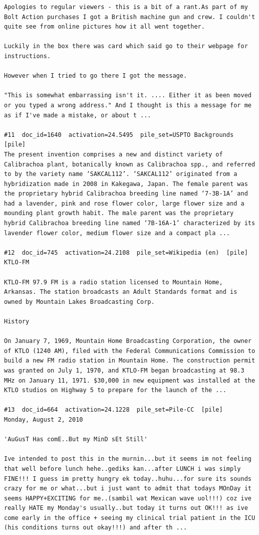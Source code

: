 \begin{verbatim}
Apologies to regular viewers - this is a bit of a rant.As part of my Bolt Action purchases I got a British machine gun and crew. I couldn't quite see from online pictures how it all went together.

Luckily in the box there was card which said go to their webpage for instructions.

However when I tried to go there I got the message.

"This is somewhat embarrassing isn't it. .... Either it as been moved or you typed a wrong address." And I thought is this a message for me as if I've made a mistake, or about t ...

#11  doc_id=1640  activation=24.5495  pile_set=USPTO Backgrounds  [pile]
The present invention comprises a new and distinct variety of Calibrachoa plant, botanically known as Calibrachoa spp., and referred to by the variety name ‘SAKCAL112’. ‘SAKCAL112’ originated from a hybridization made in 2008 in Kakegawa, Japan. The female parent was the proprietary hybrid Calibrachoa breeding line named ‘7-3B-1A’ and had a lavender, pink and rose flower color, large flower size and a mounding plant growth habit. The male parent was the proprietary hybrid Calibrachoa breeding line named ‘7B-16A-1’ characterized by its lavender flower color, medium flower size and a compact pla ...

#12  doc_id=745  activation=24.2108  pile_set=Wikipedia (en)  [pile]
KTLO-FM

KTLO-FM 97.9 FM is a radio station licensed to Mountain Home, Arkansas. The station broadcasts an Adult Standards format and is owned by Mountain Lakes Broadcasting Corp.

History

On January 7, 1969, Mountain Home Broadcasting Corporation, the owner of KTLO (1240 AM), filed with the Federal Communications Commission to build a new FM radio station in Mountain Home. The construction permit was granted on July 1, 1970, and KTLO-FM began broadcasting at 98.3 MHz on January 11, 1971. $30,000 in new equipment was installed at the KTLO studios on Highway 5 to prepare for the launch of the ...

#13  doc_id=664  activation=24.1228  pile_set=Pile-CC  [pile]
Monday, August 2, 2010

'AuGusT Has comE..But my MinD sEt Still'

Ive intended to post this in the murnin...but it seems im not feeling that well before lunch hehe..gediks kan...after LUNCH i was simply FINE!!! I guess im pretty hungry ek today..huhu...for sure its sounds crazy for me or what...but i just want to admit that todays MOnDay it seems HAPPY+EXCITING for me..(sambil wat Mexican wave uol!!!) coz ive really HATE my Monday's usually..but today it turns out OK!!! as ive come early in the office + seeing my clinical trial patient in the ICU (his conditions turns out okay!!!) and after th ...


\end{verbatim}
